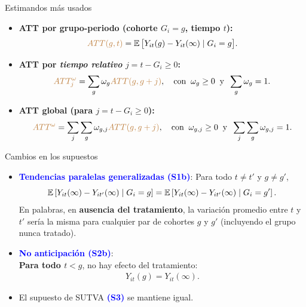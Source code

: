 \documentclass[10pt, xcolor=dvipsnames]{beamer}
\begin{document}
\begin{frame}{Estimandos más usados}
\begin{itemize}\setlength{\itemsep}{2em}
    \item \textbf{ATT por grupo-periodo (cohorte $G_i = g$, tiempo $t$):}
    \begin{align*}
        \textcolor{brown}{ATT(g,t)} = \operatorname{\mathbb{E}} \big[Y_{it}(g) - Y_{it}(\infty) \mid G_i=g\big].
    \end{align*}
    \vspace{-1.5em}
    \item \textbf{ATT por \emph{tiempo relativo} \(j=t-G_i \geq 0\):}
    \begin{align*}
        \textcolor{brown}{ATT_j^{\omega}} = \sum_{g} \omega_g \textcolor{brown}{ATT(g,g+j)}, \quad \text{con} \;\; \omega_g \geq 0 \;\; \text{y} \;\; \sum_g \omega_g = 1.
    \end{align*}
    \vspace{-1.5em}
    \item \textbf{ATT global (para \(j=t-G_i \geq 0\)):}
    \begin{align*}
        \textcolor{brown}{ATT^{\omega}} = \sum_{j} \sum_g \omega_{g,j} \textcolor{brown}{ATT(g,g+j)}, \quad \text{con} \;\; \omega_{g,j} \geq 0 \;\; \text{y} \;\; \sum_{j} \sum_g \omega_{g,j} = 1.
    \end{align*}
\end{itemize}
\end{frame}


\begin{frame}{Cambios en los supuestos}
\begin{itemize}\setlength{\itemsep}{1.0em}
    \item \textbf{\textcolor{blue}{Tendencias paralelas generalizadas (S1b)}}: Para todo \(t \neq t'\) y \(g \neq g'\),
    \begin{equation*}
    \operatorname{\mathbb{E}} \left[Y_{it}(\infty) - Y_{it'}(\infty) \mid G_i = g \right]
    =
    \operatorname{\mathbb{E}} \left[Y_{it}(\infty) - Y_{it'}(\infty) \mid G_i = g' \right].
    \end{equation*}
    En palabras, en \textbf{ausencia del tratamiento}, la variación promedio entre \(t\) y \(t'\) sería la misma para cualquier par de cohortes \(g\) y \(g'\) (incluyendo el grupo nunca tratado). 
    \item \textcolor{blue}{\textbf{No anticipación (S2b)}}: \\
    \vspace{0.5em}
    \textbf{Para todo \(t<g\)}, no hay efecto del tratamiento:
    \begin{align*}
        Y_{it}(g)=Y_{it}(\infty).
    \end{align*}
    \vspace{-1.0em}
    \item El supuesto de SUTVA \textcolor{blue}{\textbf{(S3)}} se mantiene igual.
\end{itemize}	
\end{frame}
\end{document}
